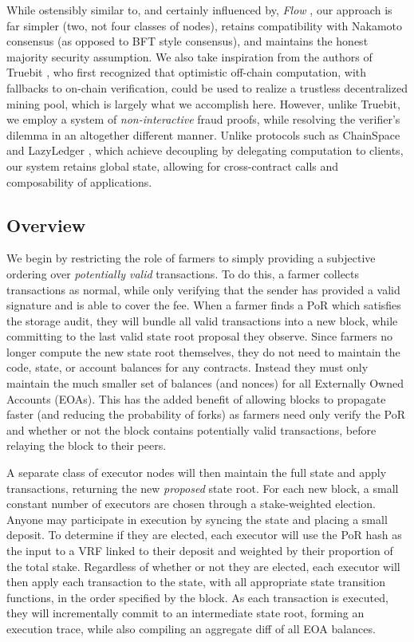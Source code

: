 \documentclass[conference]{IEEEtran}
\begin{document}
While ostensibly similar to, and certainly influenced by, \textit{Flow} \cite{hentschel2019flow}, our approach is far simpler (two, not four classes of nodes), retains compatibility with Nakamoto consensus (as opposed to BFT style consensus), and maintains the honest majority security assumption. We also take inspiration from the authors of Truebit \cite{teutsch2018truebit}, who first recognized that optimistic off-chain computation, with fallbacks to on-chain verification, could be used to realize a trustless decentralized mining pool, which is largely what we accomplish here. However, unlike Truebit, we employ a system of \textit{non-interactive} fraud proofs, while resolving the verifier’s dilemma in an altogether different manner. Unlike protocols such as ChainSpace \cite{al2017chainspace} and LazyLedger \cite{al2019lazyledger}, which achieve decoupling by delegating computation to clients, our system retains global state, allowing for cross-contract calls and composability of applications.

\subsection{Overview}

We begin by restricting the role of farmers to simply providing a subjective ordering over \textit{potentially valid} transactions. To do this, a farmer collects transactions as normal, while only verifying that the sender has provided a valid signature and is able to cover the fee.  When a farmer finds a PoR which satisfies the storage audit, they will bundle all valid transactions into a new block, while committing to the last valid state root proposal they observe. Since farmers no longer compute the new state root themselves, they do not need to maintain the code, state, or account balances for any contracts. Instead they must only maintain the much smaller set of balances (and nonces) for all Externally Owned Accounts (EOAs). This has the added benefit of allowing blocks to propagate faster (and reducing the probability of forks) as farmers need only verify the PoR and whether or not the block contains potentially valid transactions, before relaying the block to their peers.

A separate class of executor nodes will then maintain the full state and apply transactions, returning the new \textit{proposed} state root. For each new block, a small constant number of executors are chosen through a stake-weighted election. Anyone may participate in execution by syncing the state and placing a small deposit. To determine if they are elected, each executor will use the PoR hash as the input to a VRF linked to their deposit and weighted by their proportion of the total stake. Regardless of whether or not they are elected, each executor will then apply each transaction to the state, with all appropriate state transition functions, in the order specified by the block. As each transaction is executed, they will incrementally commit to an intermediate state root, forming an execution trace, while also compiling an aggregate diff of all EOA balances. 
\end{document}
